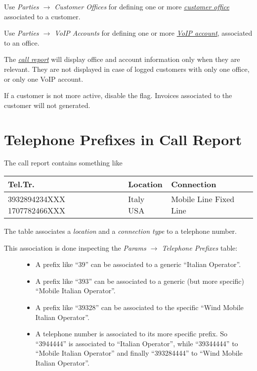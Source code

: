 \documentclass[letterpaper,10pt,english]{sphinxmanual}
\begin{document}
Use \emph{Parties \(\rightarrow\) Customer Offices} for defining one or more  {\hyperref[index:term-customer-office]{\emph{customer office}}} associated to a customer.

Use \emph{Parties \(\rightarrow\) VoIP Accounts} for defining one or more  {\hyperref[index:term-voip-account]{\emph{VoIP account}}}, associated to an office.

The {\hyperref[index:term-call-report]{\emph{call report}}} will display office and account information only when they are relevant. They are not displayed in case of logged customers with only one office, or only one VoIP account.

If a customer is not more active, disable the  flag. Invoices associated to the customer will not generated.


\section{Telephone Prefixes in Call Report}
\label{index:telephone-prefixes-in-call-report}\label{index:telephone-prefixes}
The call report contains something like

\begin{tabulary}{\linewidth}{|L|L|L|}
\hline
\textbf{
Tel.Tr.
} & \textbf{
Location
} & \textbf{
Connection
}\\
\hline

3932894234XXX
1707782466XXX
 & 
Italy
USA
 & 
Mobile Line
Fixed Line
\\
\hline
\end{tabulary}


The table associates a \emph{location} and a \emph{connection type} to a telephone number.
\begin{description}
\item[{This association is done inspecting the \emph{Params \(\rightarrow\) Telephone Prefixes} table:}] \leavevmode\begin{itemize}
\item {} 
A prefix like ``39'' can be associated to a generic ``Italian Operator''.

\item {} 
A prefix like ``393'' can be associated to a generic (but more specific) ``Mobile Italian Operator''.

\item {} 
A prefix like ``39328'' can be associated to the specific ``Wind Mobile Italian Operator''.

\item {} 
A telephone number is associated to its more specific prefix. So ``3944444'' is associated to ``Italian Operator'', while ``39344444'' to ``Mobile Italian Operator'' and finally ``393284444'' to ``Wind Mobile Italian Operator''.

\end{itemize}

\end{description}
\end{document}
